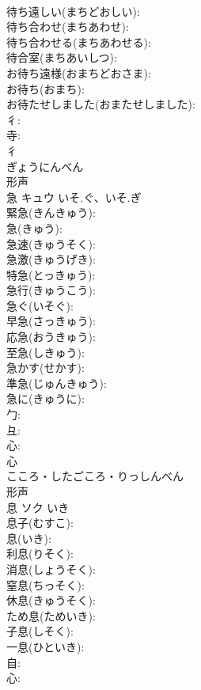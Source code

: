 \documentclass[8pt]{extreport}
\begin{document}
\begin{CJK}{UTF8}{min}
\\	待ち遠しい(まちどおしい): 
\\	待ち合わせ(まちあわせ): 
\\	待ち合わせる(まちあわせる): 
\\	待合室(まちあいしつ): 
\\	お待ち遠様(おまちどおさま): 
\\	お待ち(おまち): 
\\	お待たせしました(おまたせしました): 
\\	彳: 
\\	寺: 
\\	彳	
\\	ぎょうにんべん	
\\	形声 
\\	急	キュウ	いそ.ぐ、いそ.ぎ		
\\	緊急(きんきゅう): 
\\	急(きゅう): 
\\	急速(きゅうそく): 
\\	急激(きゅうげき): 
\\	特急(とっきゅう): 
\\	急行(きゅうこう): 
\\	急ぐ(いそぐ): 
\\	早急(さっきゅう): 
\\	応急(おうきゅう): 
\\	至急(しきゅう): 
\\	急かす(せかす): 
\\	準急(じゅんきゅう): 
\\	急に(きゅうに): 
\\	勹: 
\\	彑: 
\\	心: 
\\	心	
\\	こころ・したごころ・りっしんべん	
\\	形声 
\\	息	ソク	いき		
\\	息子(むすこ): 
\\	息(いき): 
\\	利息(りそく): 
\\	消息(しょうそく): 
\\	窒息(ちっそく): 
\\	休息(きゅうそく): 
\\	ため息(ためいき): 
\\	子息(しそく): 
\\	一息(ひといき): 
\\	自: 
\\	心: 

\end{CJK}
\end{document}
